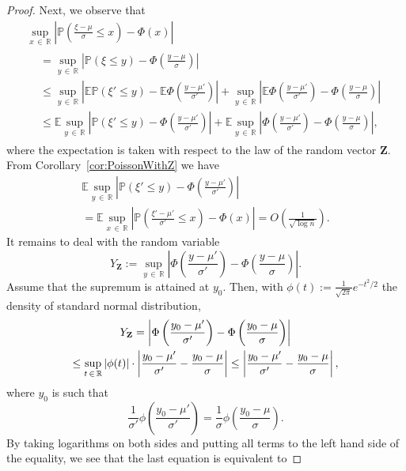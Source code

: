 \documentclass[10pt]{amsart}
\theoremstyle{definition}\newtheorem{defi}[theo]{Definition}\newtheorem{rema}[theo]{Remark}\newtheorem{exam}[theo]{Example}\newtheorem{exem}[theo]{Example}\newtheorem{nota}[theo]{Notation}
\newcommand{\bfZ}{\mathbf{Z}}
\newcommand{\bbR}{\mathbb{R}}
\newcommand{\bbE}{\mathbb{E}}
\newcommand{\bbP}{\mathbb{P}}
\begin{document}
\begin{proof}
Next, we observe that
\begin{multline}\label{eq:14.05.21_2}
\sup_{x\,\in\,\bbR} \left| \bbP\left(\frac {\xi-\mu}{\sigma}\leq x\right) - \Phi(x)\right|\\
\begin{aligned}
& = 
\sup_{y\,\in\,\bbR} \left| \bbP(\xi\leq y) - \Phi\left(\frac {y-\mu}{\sigma}\right)\right|
\\ &\leq
\sup_{y\,\in\,\bbR} \left| \bbE \bbP(\xi'\leq y) - \bbE \Phi\left(\frac {y-\mu'}{\sigma'}\right)\right| +
\sup_{y\,\in\,\bbR}\left|\bbE \Phi\left(\frac {y-\mu'}{\sigma'}\right) - \Phi\left(\frac {y-\mu}{\sigma}\right)\right| \\
& \leq
\bbE \sup_{y\,\in\,\bbR} \left| \bbP(\xi'\leq y) - \Phi\left(\frac {y-\mu'}{\sigma'}\right)\right| +
\bbE \sup_{y\,\in\,\bbR} \left|\Phi\left(\frac {y-\mu'}{\sigma'}\right) - \Phi\left(\frac {y-\mu}{\sigma}\right)\right|,
\end{aligned}
\end{multline}
where the expectation is taken with respect to the law of the random vector ${\bfZ}$. From Corollary~\ref{cor:PoissonWithZ} we have
\begin{multline}\label{eq:14.05.21_3}
\bbE \sup_{y\,\in\,\bbR} \left| \bbP(\xi'\leq y) - \Phi\left(\frac {y-\mu'}{\sigma'}\right)\right|\\
=\bbE \sup_{x\,\in\,\bbR} \left| \bbP\left(\frac {\xi'-\mu'}{\sigma'}\leq x\right) - \Phi(x)\right| = O\left(\frac{1}{\sqrt{\log n}}\right).
\end{multline}
It remains to deal with the random variable
\[
Y_{\bfZ}:=\sup_{y\,\in\,\bbR} \left|\Phi\left(\frac {y-\mu'}{\sigma'}\right) - \Phi\left(\frac {y-\mu}{\sigma}\right)\right|.
\]
Assume that the supremum is attained at $y_0$. Then, with $\phi(t):=\frac{1}{\sqrt{2\pi}}e^{-t^2/2}$ the density of standard normal distribution,
\begin{multline}\label{eq:18-05-21a}
Y_{\bf{Z}}=\left|\Phi\left(\frac {y_0-\mu'}{\sigma'}\right) - \Phi\left(\frac {y_0-\mu}{\sigma}\right)\right|\\
\leq \sup_{t\,\in\,\bbR}|\phi(t)|\cdot \left|\frac {y_0-\mu'}{\sigma'} - \frac {y_0-\mu}{\sigma}\right|\leq\left|\frac {y_0-\mu'}{\sigma'} - \frac {y_0-\mu}{\sigma}\right|,
\end{multline}
where $y_0$ is such that
\[
\frac{1}{\sigma'}\phi\left(\frac {y_0-\mu'}{\sigma'}\right) = \frac{1}{\sigma}\phi\left(\frac {y_0-\mu}{\sigma}\right).
\]
By taking logarithms on both sides and putting all terms to the left hand side of the equality, we see that the last equation is equivalent to

\end{proof}
\end{document}
